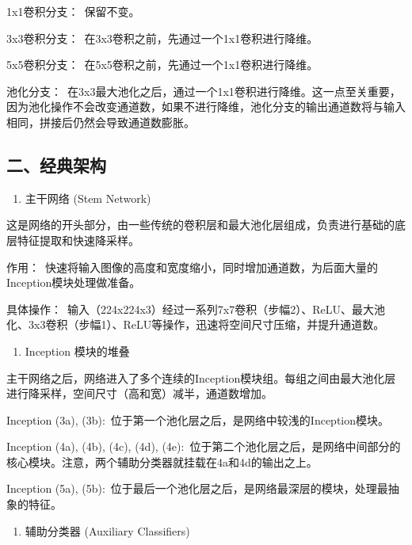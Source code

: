 1x1卷积分支：~保留不变。

3x3卷积分支：~在3x3卷积之前，先通过一个1x1卷积进行降维。

5x5卷积分支：~在5x5卷积之前，先通过一个1x1卷积进行降维。

池化分支：~在3x3最大池化之后，通过一个1x1卷积进行降维。这一点至关重要，因为池化操作不会改变通道数，如果不进行降维，池化分支的输出通道数将与输入相同，拼接后仍然会导致通道数膨胀。

\hypertarget{ux4e8cux7ecfux5178ux67b6ux6784}{%
\subsection{二、经典架构}\label{ux4e8cux7ecfux5178ux67b6ux6784}}

\begin{enumerate}
\def\labelenumi{\arabic{enumi}.}
\tightlist
\item
  主干网络 (Stem Network)
\end{enumerate}

这是网络的开头部分，由一些传统的卷积层和最大池化层组成，负责进行基础的底层特征提取和快速降采样。

作用：~快速将输入图像的高度和宽度缩小，同时增加通道数，为后面大量的Inception模块处理做准备。

具体操作：~输入（224x224x3）经过一系列7x7卷积（步幅2）、ReLU、最大池化、3x3卷积（步幅1）、ReLU等操作，迅速将空间尺寸压缩，并提升通道数。

\begin{enumerate}
\def\labelenumi{\arabic{enumi}.}
\setcounter{enumi}{1}
\tightlist
\item
  Inception 模块的堆叠
\end{enumerate}

主干网络之后，网络进入了多个连续的Inception模块组。每组之间由最大池化层进行降采样，空间尺寸（高和宽）减半，通道数增加。

Inception (3a), (3b):~位于第一个池化层之后，是网络中较浅的Inception模块。

Inception (4a), (4b), (4c), (4d), (4e):~位于第二个池化层之后，是网络中间部分的核心模块。注意，两个辅助分类器就挂载在4a和4d的输出之上。

Inception (5a), (5b):~位于最后一个池化层之后，是网络最深层的模块，处理最抽象的特征。

\begin{enumerate}
\def\labelenumi{\arabic{enumi}.}
\setcounter{enumi}{2}
\tightlist
\item
  辅助分类器 (Auxiliary Classifiers)
\end{enumerate}


